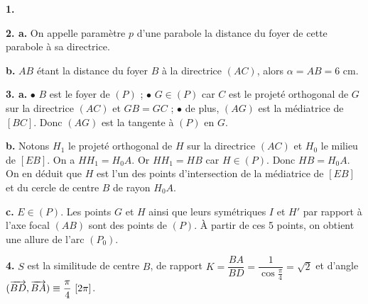 \documentclass[11pt]{article}
\begin{document}

\textbf{1.} \begin{center}
\end{center}

\textbf{2. a.} On appelle paramètre $p$ d'une parabole la distance du foyer de cette parabole à sa directrice.

\textbf{b.} $AB$ étant la distance du foyer $B$ à la directrice $(AC)$, alors $\alpha = AB = 6$ cm.

\textbf{3. a.} $\bullet$ $B$ est le foyer de $(P)$ ; $\bullet$ $G \in (P)$ car $C$ est le projeté orthogonal de $G$ sur la directrice $(AC)$ et $GB = GC$ ; $\bullet$ de plus, $(AG)$ est la médiatrice de $[BC]$. Donc $(AG)$ est la tangente à $(P)$ en $G$.

\textbf{b.} Notons $H_1$ le projeté orthogonal de $H$ sur la directrice $(AC)$ et $H_0$ le milieu de $[EB]$. On a $HH_1 = H_0A$. Or $HH_1 = HB$ car $H \in (P)$. Donc $HB = H_0A$. On en déduit que $H$ est l'un des points d'intersection de la médiatrice de $[EB]$ et du cercle de centre $B$ de rayon $H_0A$.

\textbf{c.} $E \in (P)$. Les points $G$ et $H$ ainsi que leurs symétriques $I$ et $H'$ par rapport à l'axe focal $(AB)$ sont des points de $(P)$. À partir de ces 5 points, on obtient une allure de l'arc $(P_0)$.

\textbf{4.} $S$ est la similitude de centre $B$, de rapport $K = \dfrac{BA}{BD} = \dfrac{1}{\cos\frac{\pi}{4}} = \sqrt{2}$ et d'angle $(\overrightarrow{BD}, \overrightarrow{BA}) \equiv \dfrac{\pi}{4}\ [2\pi]$.
\end{document}
